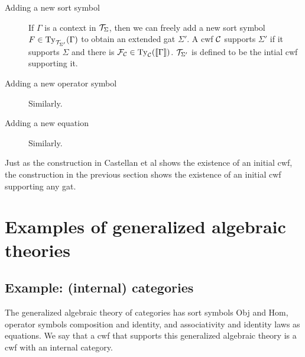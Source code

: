 \documentclass{lmcs}
\begin{document}
\begin{description}
\item[Adding a new sort symbol] 
If $\Gamma$ is a context in ${\mathcal T}_\Sigma$, then we can freely add a new sort symbol $F \in \mathrm{Ty}_{{\mathcal T}_{\Sigma'}}(\Gamma)$ to obtain an extended gat $\Sigma'$. A cwf ${\mathcal C}$ supports $\Sigma'$ if it supports $\Sigma$ and there is $\mathcal{F}_{\mathcal C} \in \mathrm{Ty}_{\mathcal C}(\llbracket \Gamma \rrbracket)$. ${\mathcal T}_{\Sigma'}$ is defined to be the intial cwf supporting it.
\item[Adding a new operator symbol] 
Similarly.
%
\item[Adding a new equation] 
Similarly.
\end{description}
Just as the construction in Castellan et al shows the existence of an initial cwf, the construction in the previous section shows the existence of an initial cwf supporting any gat.


\section{Examples of generalized algebraic theories}

\subsection{Example: (internal) categories} The generalized algebraic theory of categories has sort symbols Obj and Hom, operator symbols composition and identity, and associativity and identity laws as equations. We say that a cwf that supports this generalized algebraic theory is a cwf with an internal category.
\end{document}
